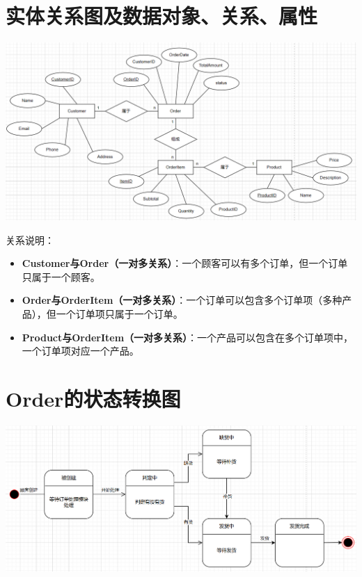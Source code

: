 \documentclass[11pt, a4paper, oneside]{ctexbook}
\begin{document}
\section{实体关系图及数据对象、关系、属性}
\centering
\includegraphics[width=\textwidth]{3.png}
\label{fig:ER}
\raggedright
关系说明：
\begin{itemize}
    \item \textbf{Customer与Order（一对多关系）}：一个顾客可以有多个订单，但一个订单只属于一个顾客。
    \item \textbf{Order与OrderItem（一对多关系）}：一个订单可以包含多个订单项（多种产品），但一个订单项只属于一个订单。
    \item \textbf{Product与OrderItem（一对多关系）}：一个产品可以包含在多个订单项中，一个订单项对应一个产品。
\end{itemize}
\newpage

\section{Order的状态转换图}
\centering
\includegraphics[width=\textwidth]{4.png}
\label{fig:status}
\end{document}
